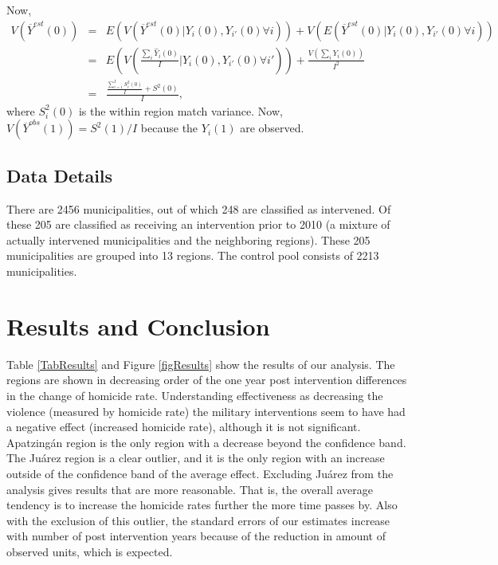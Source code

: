 \documentclass{article}[11 pt]
\begin{document}
Now, \begin{eqnarray*}
  V(\overline{Y}^{est}(0))&=&E(V(\overline{Y}^{est}(0)|Y_i(0),Y_{i'}(0) \forall i))+ 			V(E(\overline{Y}^{est}(0)|Y_i(0),Y_{i'}(0)\forall i))\\
  &=&E\left(V\left(\frac{\sum_i \hat{Y}_i(0)}{I}|Y_i(0),Y_{i'}(0) \forall i'\right)\right)+\frac{V(\sum_iY_i(0))}{I^2}\\
&=&\frac{\frac{\sum_{i=1}^I S^2_i(0)}{I}+S^2(0)}{I},
\end{eqnarray*}
where $ S^2_i(0)$ is the within region match variance. Now, $V(\overline{Y}^{obs}(1)) = S^2(1)/I$ because the $Y_i(1)$ are observed.	

\subsection{Data Details}
There are 2456 municipalities, out of which 248 are classified as intervened. Of these 205 are classified as receiving an intervention prior to 2010 (a mixture of actually intervened municipalities and the neighboring regions). These 205 municipalities are grouped into 13 regions. The control pool consists of 2213 municipalities. 
			
\section{Results and Conclusion}
Table \ref{TabResults} and Figure \ref{figResults} show the results of our analysis. The regions are shown in decreasing order of the one year post intervention differences in the change of homicide rate. Understanding effectiveness as decreasing the violence (measured by homicide rate) the military interventions seem to have had a negative effect (increased homicide rate), although it is not significant. Apatzing\'{a}n region is the only region with a decrease beyond the confidence band.  The Ju\'{a}rez region is a clear outlier, and it is the only region with an increase outside of the confidence band of the average effect. Excluding  Ju\'{a}rez from the analysis gives results that are more reasonable. That is, the overall average tendency is to increase the homicide rates further the more time passes by. Also with the exclusion of this outlier, the standard errors of our estimates increase with number of post intervention years because of the reduction in amount of observed units, which is expected. 
\end{document}
